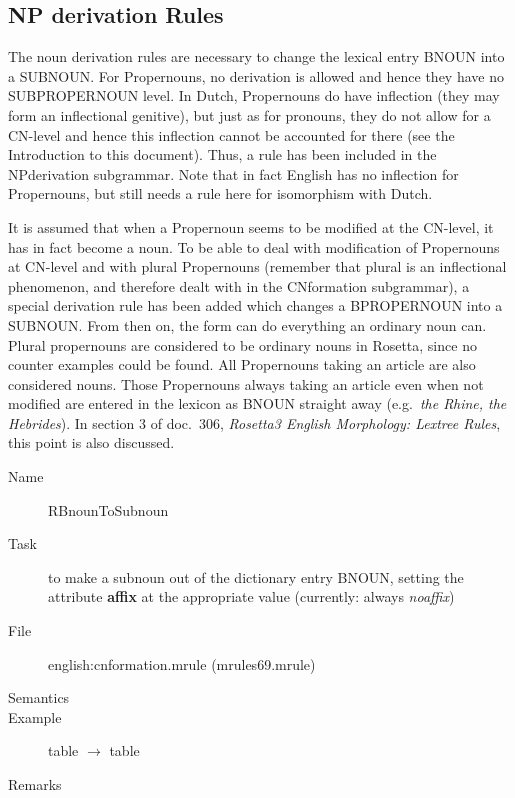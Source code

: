 \newpage
\subsection{NP derivation Rules}
The noun derivation rules are necessary to change the lexical entry BNOUN into 
a SUBNOUN. For Propernouns, no derivation is allowed and hence they have no 
SUBPROPERNOUN level. In Dutch, Propernouns do have inflection (they may form an 
inflectional genitive), but just as for 
pronouns, they do not allow for a CN-level and hence this inflection cannot 
be accounted for there (see the
Introduction to this document). Thus, a rule has been included in the
NPderivation subgrammar.
Note that in fact English has no inflection for Propernouns, but still needs a 
rule here for isomorphism with Dutch.

It is assumed that when a Propernoun seems to be modified at the CN-level, it 
has in fact become a noun. To be able to deal with modification of 
Propernouns at CN-level and with plural Propernouns (remember that plural is an 
inflectional phenomenon, and therefore dealt with in the CNformation 
subgrammar), 
a special derivation rule has been added which changes 
a BPROPERNOUN into a SUBNOUN. From then on, the form can do everything an 
ordinary noun can.
Plural propernouns are considered to be ordinary nouns in Rosetta, 
since no counter examples could be found. All Propernouns taking an 
article are also considered nouns. Those Propernouns always taking an 
article even when not modified are entered in the lexicon as BNOUN straight 
away (e.g.\ {\em the Rhine, the Hebrides\/}). In section 3 of doc.\ 306, 
{\em Rosetta3 
English Morphology: Lextree Rules\/}, this point is also discussed.

\vspace{1 cm}
\begin{description}
\item[Name] RBnounToSubnoun
\item[Task] to make a subnoun out of the dictionary entry BNOUN, setting the 
attribute {\bf affix} at the appropriate value (currently: always {\em 
noaffix\/})
\item[File] english:cnformation.mrule (mrules69.mrule)
\item[Semantics]
\item[Example] table $\rightarrow$ table
\item[Remarks]
\end{description}

